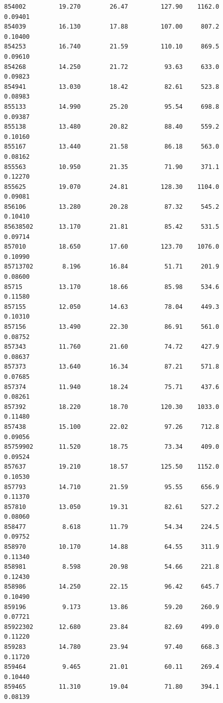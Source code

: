 \documentclass[
  letterpaper,
  DIV=11,
  numbers=noendperiod]{scrartcl}
\begin{document}
\begin{verbatim}
854002         19.270        26.47         127.90    1162.0         0.09401
854039         16.130        17.88         107.00     807.2         0.10400
854253         16.740        21.59         110.10     869.5         0.09610
854268         14.250        21.72          93.63     633.0         0.09823
854941         13.030        18.42          82.61     523.8         0.08983
855133         14.990        25.20          95.54     698.8         0.09387
855138         13.480        20.82          88.40     559.2         0.10160
855167         13.440        21.58          86.18     563.0         0.08162
855563         10.950        21.35          71.90     371.1         0.12270
855625         19.070        24.81         128.30    1104.0         0.09081
856106         13.280        20.28          87.32     545.2         0.10410
85638502       13.170        21.81          85.42     531.5         0.09714
857010         18.650        17.60         123.70    1076.0         0.10990
85713702        8.196        16.84          51.71     201.9         0.08600
85715          13.170        18.66          85.98     534.6         0.11580
857155         12.050        14.63          78.04     449.3         0.10310
857156         13.490        22.30          86.91     561.0         0.08752
857343         11.760        21.60          74.72     427.9         0.08637
857373         13.640        16.34          87.21     571.8         0.07685
857374         11.940        18.24          75.71     437.6         0.08261
857392         18.220        18.70         120.30    1033.0         0.11480
857438         15.100        22.02          97.26     712.8         0.09056
85759902       11.520        18.75          73.34     409.0         0.09524
857637         19.210        18.57         125.50    1152.0         0.10530
857793         14.710        21.59          95.55     656.9         0.11370
857810         13.050        19.31          82.61     527.2         0.08060
858477          8.618        11.79          54.34     224.5         0.09752
858970         10.170        14.88          64.55     311.9         0.11340
858981          8.598        20.98          54.66     221.8         0.12430
858986         14.250        22.15          96.42     645.7         0.10490
859196          9.173        13.86          59.20     260.9         0.07721
85922302       12.680        23.84          82.69     499.0         0.11220
859283         14.780        23.94          97.40     668.3         0.11720
859464          9.465        21.01          60.11     269.4         0.10440
859465         11.310        19.04          71.80     394.1         0.08139

\end{verbatim}
\end{document}
